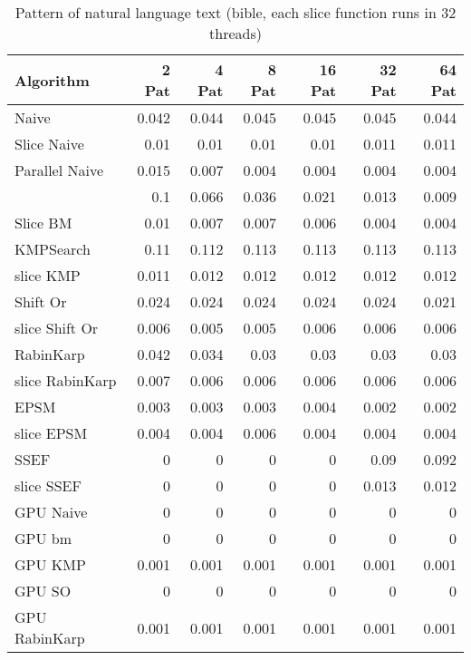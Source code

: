 \documentclass[11pt]{article}       %
\newcommand{\includeFig}[3]      {\begin{figure}[htb] \begin{center}
                                 \includegraphics
                                 [width=4in,keepaspectratio] %
                                 {#2}\caption{\label{#1}#3} \end{center} \end{figure}}
\begin{document}


\begin{table}[htbp]
  \centering
  \caption{Pattern of natural language text (bible, each slice function runs in 32 threads)}
    \begin{tabular}{lrrrrrr}\label{t1}
Algorithm & 2 Pat & 4 Pat & 8 Pat & 16 Pat & 32 Pat & 64 Pat \\
 \hline
    Naive & 0.042 & 0.044 & 0.045 & 0.045 & 0.045 & 0.044 \\
    Slice Naive & 0.01  & 0.01  & 0.01  & 0.01  & 0.011 & 0.011 \\
    Parallel Naive & 0.015 & 0.007 & 0.004 & 0.004 & 0.004 & 0.004 \\
    {Boyer-Moore & 0.1   & 0.066 & 0.036 & 0.021 & 0.013 & 0.009 \\
    Slice BM & 0.01  & 0.007 & 0.007 & 0.006 & 0.004 & 0.004 \\
    KMPSearch & 0.11  & 0.112 & 0.113 & 0.113 & 0.113 & 0.113 \\
    slice KMP & 0.011 & 0.012 & 0.012 & 0.012 & 0.012 & 0.012 \\
    Shift Or & 0.024 & 0.024 & 0.024 & 0.024 & 0.024 & 0.021 \\
    slice Shift Or & 0.006 & 0.005 & 0.005 & 0.006 & 0.006 & 0.006 \\
    RabinKarp & 0.042 & 0.034 & 0.03  & 0.03  & 0.03  & 0.03 \\
    slice RabinKarp & 0.007 & 0.006 & 0.006 & 0.006 & 0.006 & 0.006 \\
    EPSM  & 0.003 & 0.003 & 0.003 & 0.004 & 0.002 & 0.002 \\
    slice EPSM & 0.004 & 0.004 & 0.006 & 0.004 & 0.004 & 0.004 \\
    SSEF  & 0     & 0     & 0     & 0     & 0.09  & 0.092 \\
    slice SSEF & 0 & 0 & 0 & 0 & 0.013 & 0.012 \\
    GPU Naive & 0     & 0     & 0     & 0     & 0     & 0 \\
    GPU bm & 0     & 0     & 0     & 0     & 0     & 0 \\
    GPU KMP & 0.001 & 0.001 & 0.001 & 0.001 & 0.001 & 0.001 \\
    GPU SO & 0     & 0     & 0     & 0     & 0     & 0 \\
    GPU RabinKarp & 0.001 & 0.001 & 0.001 & 0.001 & 0.001 & 0.001 \\
    \end{tabular}%
  \label{tab:addlabel}%
\end{table}%
\end{document}

